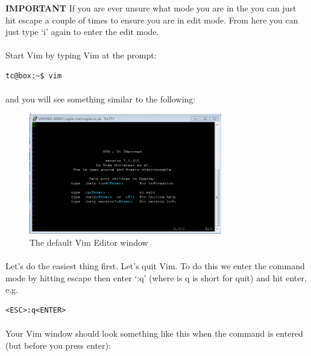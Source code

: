\documentclass[12pt, a4paper, twoside]{book}
\begin{document}
\begin{framed}
\textbf{IMPORTANT} If you are ever unsure what mode you are in the you can just hit escape a couple of times to ensure you are in edit mode. From here you can just type `i' again to enter the edit mode.
\end{framed}

\paragraph{} Start Vim by typing Vim at the prompt:
\begin{lstlisting}[style=DOS]
    tc@box:~$ vim
\end{lstlisting}
\paragraph{} and you will see something similar to the following:

\begin{figure}[H]
\centering
\includegraphics[width=0.75\textwidth]{images/vim_first.png}
\caption{The default Vim Editor window}
\label{fig:vim-first}
\end{figure}

\paragraph{} Let's do the easiest thing first. Let's quit Vim. To do this we enter the command mode by hitting escape then enter `:q' (where is q is short for quit) and hit enter, e.g.

\begin{lstlisting}[style=DOS]
    <ESC>:q<ENTER>
\end{lstlisting}
\paragraph{} Your Vim window should look something like this when the command is entered (but before you press enter):
\end{document}
